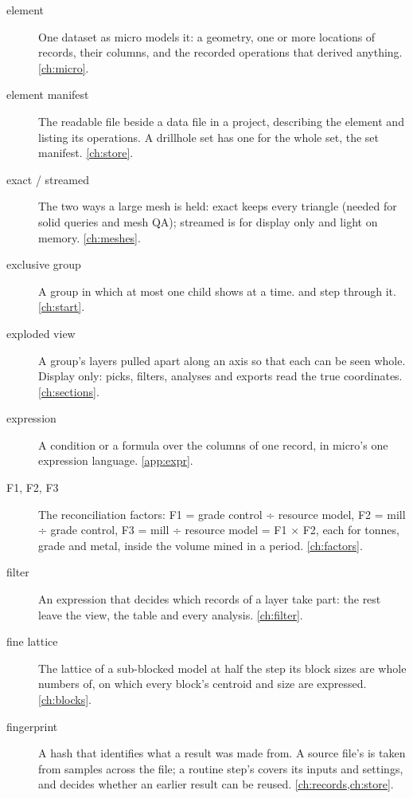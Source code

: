 \begin{description}
\item[element] One dataset as micro models it: a geometry, one or more locations of records, their
  columns, and the recorded operations that derived anything. \cref{ch:micro}.

\item[element manifest] The readable  file beside a data file in a project,
  describing the element and listing its operations. A drillhole set has one for the whole set,
  the set manifest. \cref{ch:store}.

\item[exact / streamed] The two ways a large mesh is held: exact keeps every triangle (needed for
  solid queries and mesh QA); streamed is for display only and light on memory. \cref{ch:meshes}.

\item[exclusive group] A group in which at most one child shows at a time. \key{\{} and \key{\}}
  step through it. \cref{ch:start}.

\item[exploded view] A group's layers pulled apart along an axis so that each can be seen whole.
  Display only: picks, filters, analyses and exports read the true coordinates.
  \cref{ch:sections}.

\item[expression] A condition or a formula over the columns of one record, in micro's one
  expression language. \cref{app:expr}.

\item[F1, F2, F3] The reconciliation factors: F1 = grade control ÷ resource model, F2 = mill ÷
  grade control, F3 = mill ÷ resource model = F1 × F2, each for tonnes, grade and metal, inside the
  volume mined in a period. \cref{ch:factors}.

\item[filter] An expression that decides which records of a layer take part: the rest leave the
  view, the table and every analysis. \cref{ch:filter}.

\item[fine lattice] The lattice of a sub-blocked model at half the step its block sizes are whole
  numbers of, on which every block's centroid and size are expressed. \cref{ch:blocks}.

\item[fingerprint] A hash that identifies what a result was made from. A source file's is taken
  from samples across the file; a routine step's covers its inputs and settings, and decides
  whether an earlier result can be reused. \cref{ch:records,ch:store}.


\end{description}
